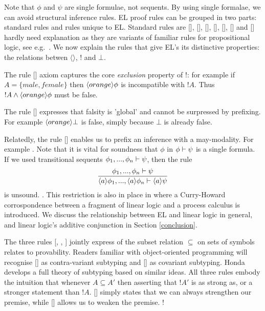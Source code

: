 \NI Note that $\phi$ and $\psi$ are single formulae, not sequents.  By
using single formalae, we can avoid structural inference rules.  EL
proof rules can be grouped in two parts: standard rules and rules
unique to EL.  Standard rules are [],
[], [],
[], [],
[] and [] hardly need
explanation as they are variants of familiar rules for propositional
logic, see e.g.~\cite{TroelstraAS:basprot,vanDalenD:logstr}.  We now
explain the rules that give EL's its distinctive properties: the
relations betwen $\langle \rangle$, $!$ and $\bot$.

The rule [] axiom captures the core
\emph{exclusion} property of !: for example if $A = \{male, female\}$
then $\langle orange \rangle \phi$ is incompatible with $!A$. Thus $!A \land
\langle orange \rangle \phi$ must be false.

The rule [] expresses that falsity is 'global'
  and cannot be surpressed by prefixing. For example
  $\langle orange \rangle \bot$ is false, simply because $\bot$ is already
  false.

Relatedly, the rule [] enables us to
prefix an inference with a may-modality. For example . Note that it is vital for soundness that $\phi$ in $\phi
\vdash \psi$ is a single formula. If we used transitional sequents $\phi_1, ..., \phi_n \vdash \psi$,
then the rule
\[
   \frac{\displaystyle{ 
     \phi_1, ..., \phi_n \vdash\psi
    }}{\displaystyle{ 
     \langle a \rangle \phi_1, ..., \langle a \rangle \phi_n \vdash\langle a \rangle \psi
    }}
\]
is unsound. . This
restriction is also in place in \cite{GaySJ:typcalosp} where a
Curry-Howard corrospondence between a fragment of linear logic
\cite{GirardJY:linlog,GirardJY:protyp} and a process calculus is
introduced. We discuss the relationship between EL and linear logic in
general, and linear logic's additive conjunction in Section
\ref{conclusion}.


The three rules [, ,
  ] jointly express of the subset relation
$\subseteq$ on sets of symbols relates to provability. Readers
familiar with object-oriented programming will recognise
[] as contra-variant subtyping and [] as covariant subtyping. Honda \cite{HondaK:thetypftpc}
develops a full theory of subtyping based on similar ideas.  All three
rules embody the intuition that whenever $A \subseteq A'$ then
asserting that $!A'$ is as strong as, or a stronger statement than
$!A$. [] simply states that we can always strengthen
our premise, while [] allows us to weaken the
premise. !

